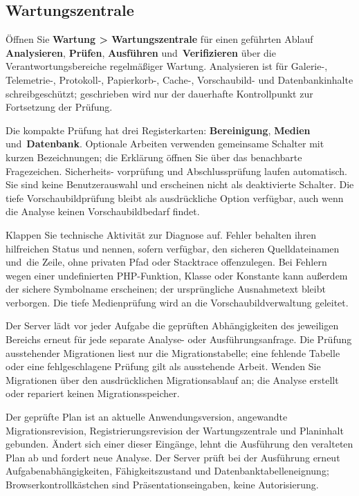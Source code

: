 \documentclass[11pt,a4paper]{article}
\newcommand{\ui}[1]{\textbf{#1}}
\begin{document}
\subsection{Wartungszentrale}

Öffnen Sie \ui{Wartung > Wartungszentrale} für einen geführten Ablauf
\ui{Analysieren}, \ui{Prüfen}, \ui{Ausführen} und~\ui{Verifizieren} über die
Verantwortungsbereiche regelmäßiger Wartung. Analysieren ist für Galerie-,
Telemetrie-, Protokoll-, Papierkorb-, Cache-, Vorschaubild- und Datenbankinhalte
schreibgeschützt; geschrieben wird nur der dauerhafte Kontrollpunkt zur
Fortsetzung der Prüfung.

Die kompakte Prüfung hat drei Registerkarten: \ui{Bereinigung}, \ui{Medien}
und~\ui{Datenbank}.
Optionale Arbeiten verwenden gemeinsame Schalter mit kurzen Bezeichnungen;
die Erklärung öffnen Sie über das benachbarte Fragezeichen. Sicherheits-
vorprüfung und Abschlussprüfung laufen automatisch. Sie sind keine
Benutzerauswahl und erscheinen nicht als deaktivierte Schalter. Die tiefe
Vorschaubildprüfung bleibt als ausdrückliche Option verfügbar, auch wenn die
Analyse keinen Vorschaubildbedarf findet.

Klappen Sie technische Aktivität zur Diagnose auf. Fehler behalten ihren
hilfreichen Status und nennen, sofern verfügbar, den sicheren Quelldateinamen
und~die Zeile, ohne privaten Pfad oder Stacktrace offenzulegen. Bei Fehlern
wegen einer undefinierten PHP-Funktion, Klasse oder Konstante kann außerdem der
sichere Symbolname erscheinen; der ursprüngliche Ausnahmetext bleibt verborgen.
Die tiefe Medienprüfung wird an die Vorschaubildverwaltung geleitet.

Der Server lädt vor jeder Aufgabe die geprüften Abhängigkeiten des jeweiligen
Bereichs erneut für jede separate Analyse- oder Ausführungsanfrage. Die Prüfung
ausstehender Migrationen liest nur die Migrationstabelle; eine fehlende Tabelle
oder eine fehlgeschlagene Prüfung gilt als ausstehende Arbeit. Wenden Sie
Migrationen über den ausdrücklichen Migrationsablauf an; die Analyse erstellt
oder repariert keinen Migrationsspeicher.

Der geprüfte Plan ist an aktuelle Anwendungsversion, angewandte
Migrationsrevision, Registrierungsrevision der Wartungszentrale und Planinhalt
gebunden. Ändert sich einer dieser Eingänge, lehnt die Ausführung den veralteten
Plan ab und fordert neue Analyse. Der Server prüft bei der Ausführung erneut
Aufgabenabhängigkeiten, Fähigkeitszustand und Datenbanktabelleneignung;
Browserkontrollkästchen sind Präsentationseingaben, keine Autorisierung.
\end{document}
